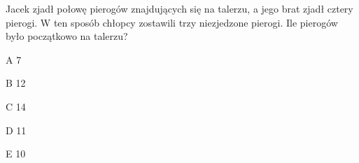 \begin{tresc}
Jacek zjadł połowę pierogów znajdujących się na talerzu, a jego brat zjadł cztery pierogi. W ten sposób chłopcy zostawili trzy niezjedzone pierogi. Ile pierogów było początkowo na talerzu?
\end{tresc}
\begin{wariant}{A} 7 \end{wariant}
\begin{wariant}{B} 12 \end{wariant}
\begin{wariant}{C} 14 \end{wariant}
\begin{wariant}{D} 11 \end{wariant}
\begin{wariant}{E} 10 \end{wariant}
